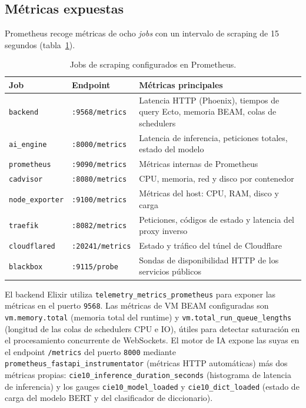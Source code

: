 \subsection{Métricas expuestas}

Prometheus recoge métricas de ocho \emph{jobs} con un intervalo de scraping de 15 segundos (tabla~\ref{tab:prometheus-jobs}).

\begin{table}[h]
\centering
\caption{Jobs de scraping configurados en Prometheus.}
\label{tab:prometheus-jobs}
\begin{tabular}{lll}
\hline
\textbf{Job} & \textbf{Endpoint} & \textbf{Métricas principales} \\
\hline
\texttt{backend} & \texttt{:9568/metrics} & Latencia HTTP (Phoenix), tiempos de query Ecto, memoria BEAM, colas de schedulers \\
\texttt{ai\_engine} & \texttt{:8000/metrics} & Latencia de inferencia, peticiones totales, estado del modelo \\
\texttt{prometheus} & \texttt{:9090/metrics} & Métricas internas de Prometheus \\
\texttt{cadvisor} & \texttt{:8080/metrics} & CPU, memoria, red y disco por contenedor \\
\texttt{node\_exporter} & \texttt{:9100/metrics} & Métricas del host: CPU, RAM, disco y carga \\
\texttt{traefik} & \texttt{:8082/metrics} & Peticiones, códigos de estado y latencia del proxy inverso \\
\texttt{cloudflared} & \texttt{:20241/metrics} & Estado y tráfico del túnel de Cloudflare \\
\texttt{blackbox} & \texttt{:9115/probe} & Sondas de disponibilidad HTTP de los servicios públicos \\
\hline
\end{tabular}
\end{table}

El backend Elixir utiliza \texttt{telemetry\_metrics\_prometheus} para exponer las métricas en el puerto \texttt{9568}. Las métricas de VM BEAM configuradas son \texttt{vm.memory.total} (memoria total del runtime) y \texttt{vm.total\_run\_queue\_lengths} (longitud de las colas de schedulers CPU e IO), útiles para detectar saturación en el procesamiento concurrente de WebSockets. El motor de IA expone las suyas en el endpoint \texttt{/metrics} del puerto \texttt{8000} mediante \texttt{prometheus\_fastapi\_instrumentator} (métricas HTTP automáticas) más dos métricas propias: \texttt{cie10\_inference\_duration\_seconds} (histograma de latencia de inferencia) y los gauges \texttt{cie10\_model\_loaded} y \texttt{cie10\_dict\_loaded} (estado de carga del modelo BERT y del clasificador de diccionario).

